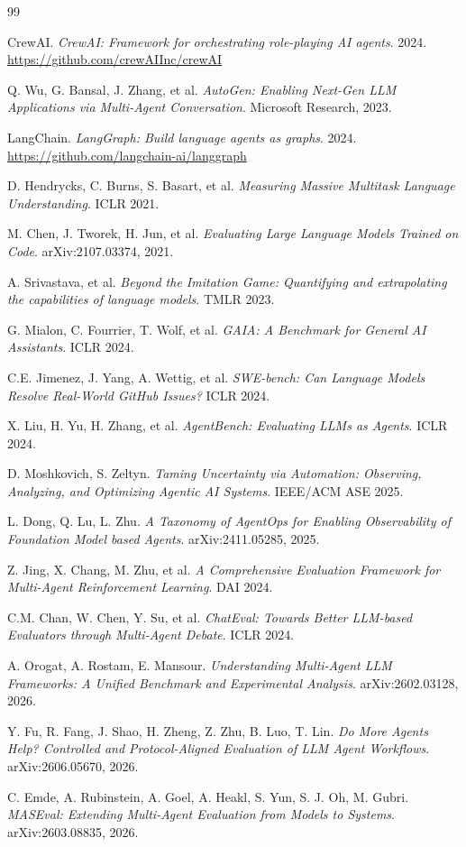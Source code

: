 \documentclass[sigconf,nonacm]{acmart}
\begin{document}

\begin{thebibliography}{99}

CrewAI. \emph{CrewAI: Framework for orchestrating role-playing AI agents}. 2024.
\url{https://github.com/crewAIInc/crewAI}

Q. Wu, G. Bansal, J. Zhang, et al. \emph{AutoGen: Enabling Next-Gen LLM Applications via Multi-Agent Conversation}. Microsoft Research, 2023.

LangChain. \emph{LangGraph: Build language agents as graphs}. 2024.
\url{https://github.com/langchain-ai/langgraph}

D. Hendrycks, C. Burns, S. Basart, et al. \emph{Measuring Massive Multitask Language Understanding}. ICLR 2021.

M. Chen, J. Tworek, H. Jun, et al. \emph{Evaluating Large Language Models Trained on Code}. arXiv:2107.03374, 2021.

A. Srivastava, et al. \emph{Beyond the Imitation Game: Quantifying and extrapolating the capabilities of language models}. TMLR 2023.

G. Mialon, C. Fourrier, T. Wolf, et al. \emph{GAIA: A Benchmark for General AI Assistants}. ICLR 2024.

C.E. Jimenez, J. Yang, A. Wettig, et al. \emph{SWE-bench: Can Language Models Resolve Real-World GitHub Issues?} ICLR 2024.

X. Liu, H. Yu, H. Zhang, et al. \emph{AgentBench: Evaluating LLMs as Agents}. ICLR 2024.

D. Moshkovich, S. Zeltyn. \emph{Taming Uncertainty via Automation: Observing, Analyzing, and Optimizing Agentic AI Systems}. IEEE/ACM ASE 2025.

L. Dong, Q. Lu, L. Zhu. \emph{A Taxonomy of AgentOps for Enabling Observability of Foundation Model based Agents}. arXiv:2411.05285, 2025.

Z. Jing, X. Chang, M. Zhu, et al. \emph{A Comprehensive Evaluation Framework for Multi-Agent Reinforcement Learning}. DAI 2024.

C.M. Chan, W. Chen, Y. Su, et al. \emph{ChatEval: Towards Better LLM-based Evaluators through Multi-Agent Debate}. ICLR 2024.

A. Orogat, A. Rostam, E. Mansour. \emph{Understanding Multi-Agent LLM Frameworks: A Unified Benchmark and Experimental Analysis}. arXiv:2602.03128, 2026.

Y. Fu, R. Fang, J. Shao, H. Zheng, Z. Zhu, B. Luo, T. Lin. \emph{Do More Agents Help? Controlled and Protocol-Aligned Evaluation of LLM Agent Workflows}. arXiv:2606.05670, 2026.

C. Emde, A. Rubinstein, A. Goel, A. Heakl, S. Yun, S. J. Oh, M. Gubri. \emph{MASEval: Extending Multi-Agent Evaluation from Models to Systems}. arXiv:2603.08835, 2026.

\end{thebibliography}
\end{document}
